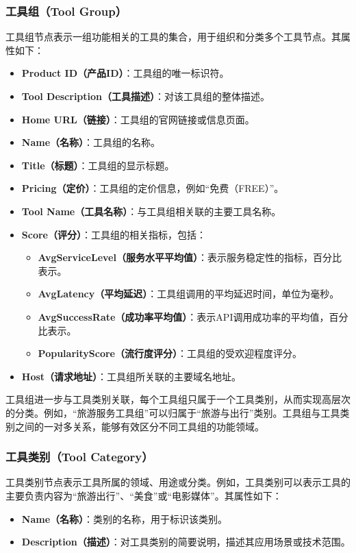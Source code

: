 \subsubsection{工具组（Tool Group）}
工具组节点表示一组功能相关的工具的集合，用于组织和分类多个工具节点。其属性如下：
\begin{itemize}
    \item \textbf{Product ID（产品ID）}：工具组的唯一标识符。
    \item \textbf{Tool Description（工具描述）}：对该工具组的整体描述。
    \item \textbf{Home URL（链接）}：工具组的官网链接或信息页面。
    \item \textbf{Name（名称）}：工具组的名称。
    \item \textbf{Title（标题）}：工具组的显示标题。
    \item \textbf{Pricing（定价）}：工具组的定价信息，例如``免费（FREE）''。
    \item \textbf{Tool Name（工具名称）}：与工具组相关联的主要工具名称。
    \item \textbf{Score（评分）}：工具组的相关指标，包括：
        \begin{itemize}
            \item \textbf{AvgServiceLevel（服务水平平均值）}：表示服务稳定性的指标，百分比表示。
            \item \textbf{AvgLatency（平均延迟）}：工具组调用的平均延迟时间，单位为毫秒。
            \item \textbf{AvgSuccessRate（成功率平均值）}：表示API调用成功率的平均值，百分比表示。
            \item \textbf{PopularityScore（流行度评分）}：工具组的受欢迎程度评分。
        \end{itemize}
    \item \textbf{Host（请求地址）}：工具组所关联的主要域名地址。
\end{itemize}

工具组进一步与工具类别关联，每个工具组只属于一个工具类别，从而实现高层次的分类。例如，“旅游服务工具组”可以归属于“旅游与出行”类别。工具组与工具类别之间的一对多关系，能够有效区分不同工具组的功能领域。


\subsubsection{工具类别（Tool Category）}
工具类别节点表示工具所属的领域、用途或分类。例如，工具类别可以表示工具的主要负责内容为“旅游出行”、“美食”或“电影媒体”。其属性如下：
\begin{itemize}
    \item \textbf{Name（名称）}：类别的名称，用于标识该类别。
    \item \textbf{Description（描述）}：对工具类别的简要说明，描述其应用场景或技术范围。
\end{itemize}

